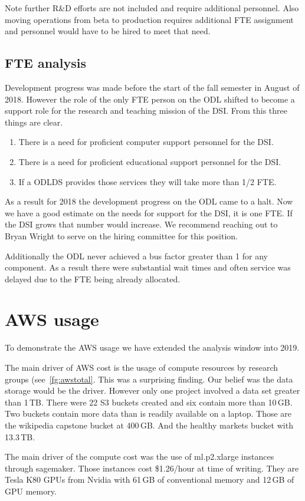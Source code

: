 Note further R\&D efforts are not included and require additional personnel. Also moving operations from beta to production requires additional FTE assignment and personnel would have to be hired to meet that need.

\subsection{FTE analysis}
Development progress was made before the start of the fall semester in August of 2018. However the role of the only FTE person on the ODL shifted to become a support role for the research and teaching mission of the DSI. From this three things are clear. 
\begin{enumerate}
\item There is a need for proficient computer support personnel for the DSI.
\item There is a need for proficient educational support personnel for the DSI.
\item If a ODLDS provides those services they will take more than 1/2 FTE.
\end{enumerate}
As a result for 2018 the development progress on the ODL came to a halt. Now we have a good estimate on the needs for support for the DSI, it is one FTE. If the DSI grows that number would increase. We recommend reaching out to Bryan Wright to serve on the hiring committee for this position.

Additionally the ODL never achieved a bus factor greater than 1 for any component. As a result there were substantial wait times and often service was delayed due to the FTE being already allocated.

\section{AWS usage}
To demonstrate the AWS usage we have extended the analysis window into 2019. 

The main driver of AWS cost is the usage of compute resources by research groups (see~\ref{fg:awstotal}. This was a surprising finding. Our belief was the data storage would be the driver. However only one project involved a data set greater than 1\,TB.
There were 22 S3 buckets created and six contain more than 10\,GB. Two buckets contain more data than is readily available on a laptop. Those are the wikipedia capstone bucket at 400\,GB. And the healthy markets bucket with 13.3\,TB.

The main driver of the compute cost was the use of ml.p2.xlarge instances through sagemaker. Those instances cost \$1.26/hour at time of writing. They are Tesla K80 GPUs from Nvidia with 61\,GB of conventional memory and 12\,GB of GPU memory.


